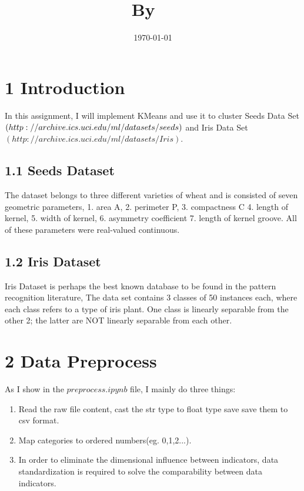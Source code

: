 \documentclass{article}
\title{
    \vspace{2in}
    \textmd{\textbf{\hmwkClass\\ \hmwkTitle}}\\
    \normalsize\vspace{0.1in}\small{By\ \textit{\hmwkClassInstructor\ \hmwkClassTime }}\\
    \vspace{3in}
}
\author{\textbf{\hmwkAuthorName}}
\date{\today}
\begin{document}
	\maketitle
	\newpage

	\section*{1 Introduction} %
	In this assignment, I will implement KMeans and use it to cluster Seeds Data Set \((http://archive.ics.uci.edu/ \\
	ml/datasets/seeds)\) and Iris Data Set\((http://archive.ics.uci.edu/ml/datasets/Iris)\).

		\subsection{1.1 Seeds Dataset}
			The dataset belongs to three different varieties of wheat and is consisted of seven geometric parameters, 1. area A,
			2. perimeter P,
			3. compactness C
			4. length of kernel,
			5. width of kernel,
			6. asymmetry coefficient
			7. length of kernel groove. All of these parameters were real-valued continuous.

		\subsection{1.2 Iris Dataset}
			Iris Dataset is perhaps the best known database to be found in the pattern recognition literature, 
			The data set contains 3 classes of 50 instances each, where each class refers to a type of iris plant.
			One class is linearly separable from the other 2; the latter are NOT linearly separable from each other.

	\section{2 Data Preprocess}
	As I show in the $preprocess.ipynb$ file, I mainly do three things:
		\begin{enumerate}[1.]
			\item Read the raw file content, cast the str type to float type save save them to csv format.
			\item Map categories to ordered numbers(eg. 0,1,2...).
			\item In order to eliminate the dimensional influence between indicators, data standardization
				is required to solve the comparability between data indicators.
		\end{enumerate}
\end{document}
